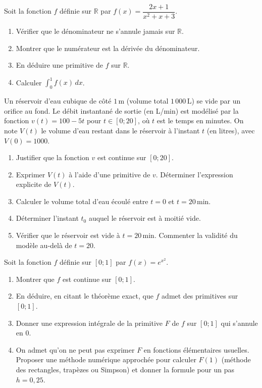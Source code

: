 \documentclass[11pt]{article}
\newcounter{popsec}
\newcounter{popsub}
\newcommand{\courssub}[1]{%
  \stepcounter{popsub}%
  \par\vspace{9pt}\noindent{\popxbold\fontsize{11.5}{13}\selectfont\color{popink}{\color{poporange}\thepopsec.\thepopsub}\hspace{6pt}#1}\par\nopagebreak\vspace{4pt}
}
\begin{document}
\begin{exercice}
Soit la fonction $f$ définie sur $\mathbb{R}$ par $f(x)=\dfrac{2x+1}{x^2+x+3}$.
\begin{enumerate}
    \item Vérifier que le dénominateur ne s'annule jamais sur $\mathbb{R}$.
    \item Montrer que le numérateur est la dérivée du dénominateur.
    \item En déduire une primitive de $f$ sur $\mathbb{R}$.
    \item Calculer $\displaystyle\int_0^1 f(x)\,dx$.
\end{enumerate}
\end{exercice}

\courssub{Je me prépare au Probatoire}

\begin{exercice}
Un réservoir d'eau cubique de côté $1\,\text{m}$ (volume total $1\,000\,\text{L}$) se vide par un orifice au fond. Le débit instantané de sortie (en L/min) est modélisé par la fonction $v(t)=100-5t$ pour $t\in[0;20]$, où $t$ est le temps en minutes. On note $V(t)$ le volume d'eau restant dans le réservoir à l'instant $t$ (en litres), avec $V(0)=1000$.
\begin{enumerate}
    \item Justifier que la fonction $v$ est continue sur $[0;20]$.
    \item Exprimer $V(t)$ à l'aide d'une primitive de $v$. Déterminer l'expression explicite de $V(t)$.
    \item Calculer le volume total d'eau écoulé entre $t=0$ et $t=20\,\text{min}$.
    \item Déterminer l'instant $t_0$ auquel le réservoir est à moitié vide.
    \item Vérifier que le réservoir est vide à $t=20\,\text{min}$. Commenter la validité du modèle au-delà de $t=20$.
\end{enumerate}
\end{exercice}

\begin{exercice}
Soit la fonction $f$ définie sur $[0;1]$ par $f(x)=e^{x^2}$.
\begin{enumerate}
    \item Montrer que $f$ est continue sur $[0;1]$.
    \item En déduire, en citant le théorème exact, que $f$ admet des primitives sur $[0;1]$.
    \item Donner une expression intégrale de la primitive $F$ de $f$ sur $[0;1]$ qui s'annule en $0$.
    \item On admet qu'on ne peut pas exprimer $F$ en fonctions élémentaires usuelles. Proposer une méthode numérique approchée pour calculer $F(1)$ (méthode des rectangles, trapèzes ou Simpson) et donner la formule pour un pas $h=0,25$.
\end{enumerate}
\end{exercice}
\end{document}
